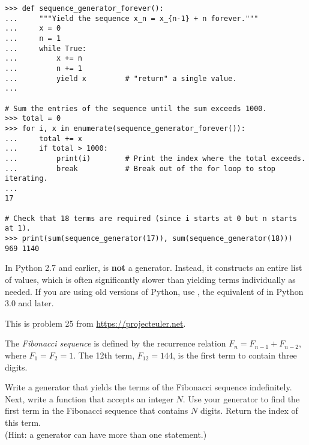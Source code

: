 \begin{lstlisting}
>>> def sequence_generator_forever():
...     """Yield the sequence x_n = x_{n-1} + n forever."""
...     x = 0
...     n = 1
...     while True:
...         x += n
...         n += 1
...         yield x         # "return" a single value.
...

# Sum the entries of the sequence until the sum exceeds 1000.
>>> total = 0
>>> for i, x in enumerate(sequence_generator_forever()):
...     total += x
...     if total > 1000:
...         print(i)        # Print the index where the total exceeds.
...         break           # Break out of the for loop to stop iterating.
...
17

# Check that 18 terms are required (since i starts at 0 but n starts at 1).
>>> print(sum(sequence_generator(17)), sum(sequence_generator(18)))
969 1140
\end{lstlisting}

\begin{warn} %
In Python 2.7 and earlier,  is \textbf{not} a generator.
Instead, it constructs an entire list of values, which is often significantly slower than yielding terms individually as needed.
If you are using old versions of Python, use , the equivalent of  in Python 3.0 and later.
\end{warn}

\begin{problem} %
This is problem 25 from \url{https://projecteuler.net}.

The \emph{Fibonacci sequence} is defined by the recurrence relation $F_{n} = F_{n-1} + F_{n-2}$, where $ F_1 = F_2 = 1$.
The 12th term, $F_{12} = 144$, is the first term to contain three digits.

Write a generator that yields the terms of the Fibonacci sequence indefinitely.
Next, write a function that accepts an integer $N$.
Use your generator to find the first term in the Fibonacci sequence that contains $N$ digits.
Return the index of this term.
\\(Hint: a generator can have more than one  statement.)
\end{problem}


